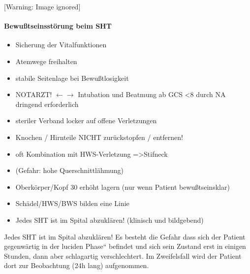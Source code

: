 \documentclass{article}
\begin{document}
\begin{center}
 [Warning: Image ignored] %

\end{center}
\paragraph{Bewu{\ss}tseinsst\"orung beim SHT}
\begin{itemize}
\item Sicherung der Vitalfunktionen

\item Atemwege freihalten

\item stabile Seitenlage bei Bewu{\ss}tlosigkeit

\item NOTARZT! ${\leftarrow}$${\rightarrow}$ Intubation und Beatmung ab
GCS {\textless}8 durch NA dringend  erforderlich

\item steriler Verband locker auf offene  Verletzungen

\item Knochen / Hirnteile NICHT  zur\"uckstopfen /  entfernen!

\item oft Kombination mit HWS-Verletzung  ={\textgreater}Stifneck    

\end{itemize}
\begin{itemize}
\item (Gefahr: hohe Querschnittl\"ahmung)

\end{itemize}
\begin{itemize}
\item Oberk\"orper/Kopf 30{\textdegree} erh\"oht lagern (nur wenn
Patient bewu{\ss}tseinsklar)

\item Sch\"adel/HWS/BWS bilden eine Linie

\end{itemize}
\begin{itemize}
\item Jedes SHT ist im Spital abzukl\"aren! (klinisch und  bildgebend)

\end{itemize}
Jedes SHT ist im Spital abzukl\"aren! Es besteht die Gefahr dass sich
der Patient gegenw\"artig in der {\quotedblbase}luciden
Phase{\textquotedblleft} befindet und sich sein Zustand erst in einigen
Stunden, dann aber schlagartig verschlechtert. Im Zweifelsfall wird der
Patient dort zur  Beobachtung (24h lang) aufgenommen.
\end{document}
